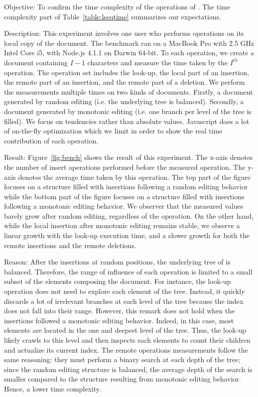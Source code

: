 \begin{asparadesc}
\item [Objective:] To confirm the time complexity of the operations of
  \LSEQ. The time complexity part of Table~\ref{table:lseqtime}
  summarizes our expectations.
\item [Description:] This experiment involves one user who performs operations
  on its local copy of the document. The benchmark ran on a MacBook Pro with 2.5
  GHz Intel Core i5, with Node.js 4.1.1 on Darwin 64-bit. To each operation, we
  create a document containing $I-1$ characters and measure the time taken by
  the $I^{th}$ operation. The operation set includes the look-up, the local part
  of an insertion, the remote part of an insertion, and the remote part of a
  deletion. We perform the measurements multiple times on two kinds of
  documents. Firstly, a document generated by random editing (i.e. the
  underlying \LSEQ tree is balanced). Secondly, a document generated by
  monotonic editing (i.e. one branch per level of the \LSEQ tree is filled).  We
  focus on tendencies rather than absolute values. Javascript does a lot of
  on-the-fly optimization which we limit in order to show the real time
  contribution of each operation.
\item [Result:] Figure~\ref{fig:bench} shows the result of this experiment. The
  x-axis denotes the number of insert operations performed before the measured
  operation. The y-axis denotes the average time taken by this operation. The
  top part of the figure focuses on a structure filled with insertions following
  a random editing behavior while the bottom part of the figure focuses on a
  structure filled with insertions following a monotonic editing behavior. We
  observer that the measured values barely grow after random editing, regardless
  of the operation. On the other hand, while the local insertion after monotonic
  editing remains stable, we observe a linear growth with the look-up execution
  time, and a slower growth for both the remote insertions and the remote
  deletions.
\item [Reason:] After the insertions at random positions, the underlying tree
  of \LSEQ is balanced. Therefore, the range of influence of each operation is
  limited to a small subset of the elements composing the document. For
  instance, the look-up operation does not need to explore each element of the
  tree. Instead, it quickly discards a lot of irrelevant branches at each level
  of the tree because the index does not fall into their range. However, this
  remark does not hold when the insertions followed a monotonic editing
  behavior. Indeed, in this case, most elements are located in the one and
  deepest level of the tree. Thus, the look-up likely crawls to this level and
  then inspects each elements to count their children and actualize its current
  index. The remote operations measurements follow the same reasoning: they must
  perform a binary search at each depth of the tree; since the random editing
  structure is balanced, the average depth of the search is smaller compared to
  the structure resulting from monotonic editing behavior. Hence, a lower time
  complexity.
\end{asparadesc}


